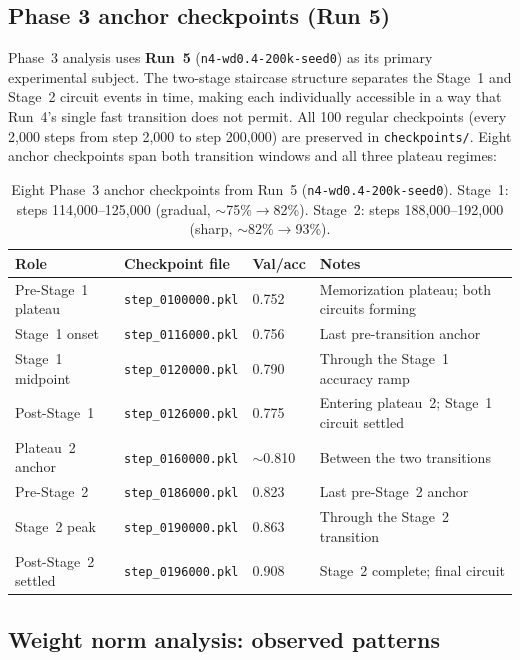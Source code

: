 \documentclass[11pt, a4paper]{article}
\begin{document}
\subsection{Phase 3 anchor checkpoints (Run 5)}
\label{sec:checkpoints}

Phase~3 analysis uses \textbf{Run~5} (\texttt{n4-wd0.4-200k-seed0}) as its
primary experimental subject. The two-stage staircase structure separates the
Stage~1 and Stage~2 circuit events in time, making each individually accessible
in a way that Run~4's single fast transition does not permit. All 100 regular
checkpoints (every 2{,}000 steps from step 2{,}000 to step 200{,}000) are
preserved in \texttt{checkpoints/}. Eight anchor checkpoints span both
transition windows and all three plateau regimes:

\begin{table}[H]
\centering
\begin{tabular}{@{}llll@{}}
\toprule
Role & Checkpoint file & Val/acc & Notes \\
\midrule
Pre-Stage~1 plateau   & \texttt{step\_0100000.pkl} & 0.752 &
  Memorization plateau; both circuits forming \\
Stage~1 onset         & \texttt{step\_0116000.pkl} & 0.756 &
  Last pre-transition anchor \\
Stage~1 midpoint      & \texttt{step\_0120000.pkl} & 0.790 &
  Through the Stage~1 accuracy ramp \\
Post-Stage~1          & \texttt{step\_0126000.pkl} & 0.775 &
  Entering plateau~2; Stage~1 circuit settled \\
Plateau~2 anchor      & \texttt{step\_0160000.pkl} & $\sim$0.810 &
  Between the two transitions \\
Pre-Stage~2           & \texttt{step\_0186000.pkl} & 0.823 &
  Last pre-Stage~2 anchor \\
Stage~2 peak          & \texttt{step\_0190000.pkl} & 0.863 &
  Through the Stage~2 transition \\
Post-Stage~2 settled  & \texttt{step\_0196000.pkl} & 0.908 &
  Stage~2 complete; final circuit \\
\bottomrule
\end{tabular}
\caption{Eight Phase~3 anchor checkpoints from Run~5 (\texttt{n4-wd0.4-200k-seed0}).
  Stage~1: steps 114{,}000--125{,}000 (gradual, $\sim$75\%$\to$82\%).
  Stage~2: steps 188{,}000--192{,}000 (sharp, $\sim$82\%$\to$93\%).}
\end{table}

\subsection{Weight norm analysis: observed patterns}
\label{sec:norm-findings}
\end{document}
